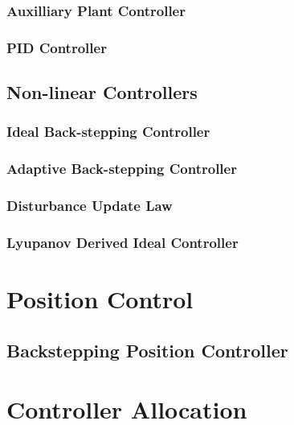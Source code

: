 \subsubsection{Auxilliary Plant Controller}
\subsubsection{PID Controller}
\subsection{Non-linear Controllers}
\label{subsec:control.attitude.nonlinear}
\subsubsection{Ideal Back-stepping Controller}
\subsubsection{Adaptive Back-stepping Controller}
\subsubsection*{Disturbance Update Law}
\subsubsection{Lyupanov Derived Ideal Controller}

\section{Position Control}
\label{sec:control.position}
\subsection{Backstepping Position Controller}
\label{subsec:control.position.bacstepping}

\section{Controller Allocation}
\label{sec:control.allocation}
